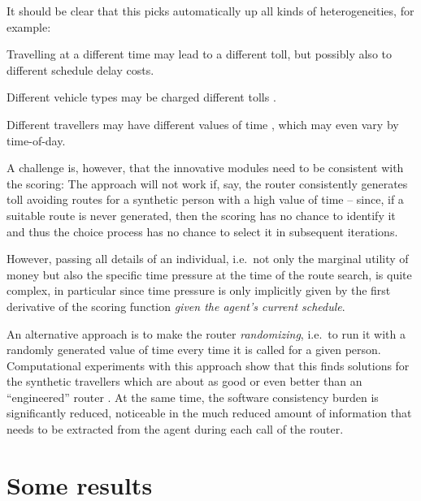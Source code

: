 It should be clear that this picks automatically up all kinds of heterogeneities, for example:
\begin{compactitem}

\item Travelling at a different time may lead to a different toll, but possibly also to different schedule delay costs. 

\item Different vehicle types may be charged different tolls \citep{KickhoeferNagel2012EmissionInternalization}.

\item Different travellers may have different values of time \citep{NagelKickhoeferJoubertHeterogeneousVoTs}, which may even vary by time-of-day.
  
\end{compactitem}

A challenge is, however, that the innovative  modules need to be consistent with the scoring: The approach will not work if, say, the router consistently generates toll avoiding routes for a synthetic person with a high value of time -- since, if a suitable route is never generated, then the scoring has no chance to identify it and thus the choice process has no chance to select it in subsequent iterations.  

However, passing all details of an individual, i.e.\ not only the marginal utility of money but also the specific time pressure at the time of the route search, is quite complex, in particular since time pressure is only implicitly given by the first derivative of the scoring function \emph{given the agent's current schedule}.  

An alternative approach is to make the router \emph{randomizing}, i.e.\ to run it with a randomly generated value of time every time it is called for a given person.  Computational experiments with this approach show that this finds solutions for the synthetic travellers which are about as good or even better than an ``engineered'' router \citep{NagelKickhoeferJoubertHeterogeneousVoTs}.  At the same time, the software consistency burden is significantly reduced, noticeable in the much reduced amount of information that needs to be extracted from the agent during each call of the router.

\section{Some results}

